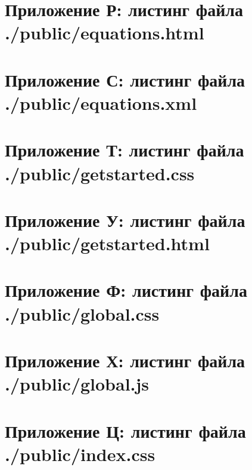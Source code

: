 \documentclass{article}
\begin{document}
    \section{Приложение Р: листинг файла ./public/equations.html}
    

    \section{Приложение С: листинг файла ./public/equations.xml}
    

    \section{Приложение Т: листинг файла ./public/getstarted.css}
    

    \section{Приложение У: листинг файла ./public/getstarted.html}
    

    \section{Приложение Ф: листинг файла ./public/global.css}
    

    \section{Приложение Х: листинг файла ./public/global.js}
    

    \section{Приложение Ц: листинг файла ./public/index.css}
    
\end{document}
